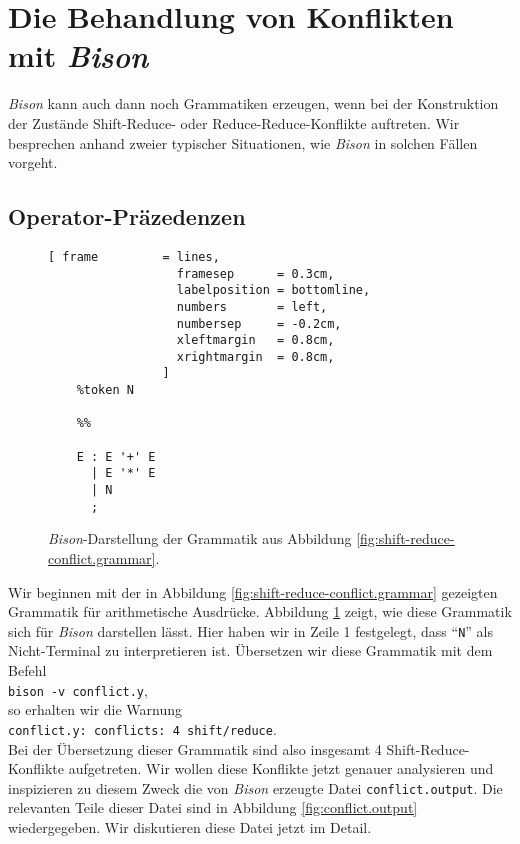 \vspace*{\fill}
\pagebreak

\section{Die Behandlung von Konflikten mit \textsl{Bison}}
\textsl{Bison} kann auch dann noch Grammatiken erzeugen, wenn bei der Konstruktion der Zust\"ande Shift-Reduce-
oder Reduce-Reduce-Konflikte auftreten.  Wir besprechen anhand zweier typischer Situationen, wie
\textsl{Bison} in solchen F\"allen vorgeht.

\subsection{Operator-Pr\"azedenzen}
\begin{figure}[!ht]
\centering
\begin{Verbatim}[ frame         = lines, 
                  framesep      = 0.3cm, 
                  labelposition = bottomline,
                  numbers       = left,
                  numbersep     = -0.2cm,
                  xleftmargin   = 0.8cm,
                  xrightmargin  = 0.8cm,
                ]
    %token N
    
    %%
    
    E : E '+' E
      | E '*' E
      | N
      ;
\end{Verbatim}
\vspace*{-0.3cm}
\caption{\textsl{Bison}-Darstellung der Grammatik aus Abbildung \ref{fig:shift-reduce-conflict.grammar}.}
\label{fig:conflict.y}
\end{figure}

\noindent
Wir beginnen mit der in Abbildung \ref{fig:shift-reduce-conflict.grammar} gezeigten Grammatik f\"ur
arithmetische Ausdr\"ucke.  Abbildung \ref{fig:conflict.y} zeigt, wie diese Grammatik sich f\"ur \textsl{Bison}
darstellen l\"asst.   Hier haben wir in Zeile 1 festgelegt, dass ``\texttt{N}'' als Nicht-Terminal zu
interpretieren ist.  \"Ubersetzen wir diese Grammatik mit dem Befehl
\\[0.2cm]
\hspace*{1.3cm}
\texttt{bison -v conflict.y},
\\[0.2cm]
so erhalten wir die Warnung
\\[0.2cm]
\hspace*{1.3cm}
\texttt{conflict.y: conflicts: 4 shift/reduce}.
\\[0.2cm]
Bei der \"Ubersetzung dieser Grammatik sind also insgesamt 4 Shift-Reduce-Konflikte aufgetreten.
Wir wollen diese Konflikte jetzt genauer analysieren und inspizieren zu diesem Zweck die von \textsl{Bison}
erzeugte Datei \texttt{conflict.output}.  Die relevanten Teile dieser Datei sind in Abbildung
\ref{fig:conflict.output} wiedergegeben.  Wir diskutieren diese Datei jetzt im Detail.

